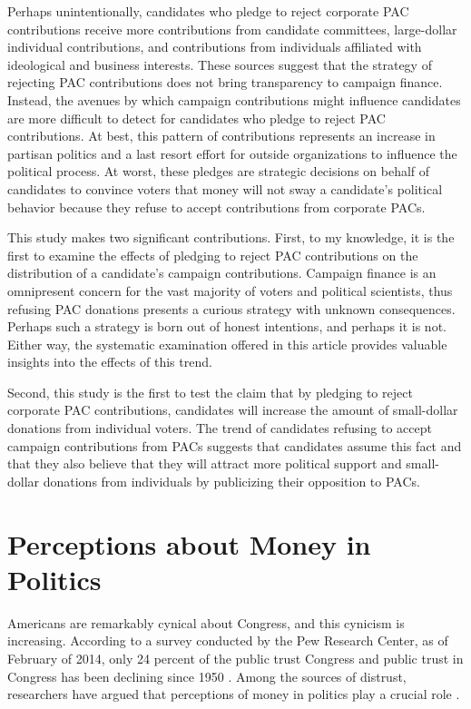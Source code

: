 \documentclass[12pt]{article}
\begin{document}
Perhaps unintentionally, candidates who pledge to reject corporate PAC contributions receive more contributions from candidate committees, large-dollar individual contributions, and contributions from individuals affiliated with ideological and business interests. These sources suggest that the strategy of rejecting PAC contributions does not bring transparency to campaign finance. Instead, the avenues by which campaign contributions might influence candidates are more difficult to detect for candidates who pledge to reject PAC contributions. At best, this pattern of contributions represents an increase in partisan politics and a last resort effort for outside organizations to influence the political process. At worst, these pledges are strategic decisions on behalf of candidates to convince voters that money will not sway a candidate's political behavior because they refuse to accept contributions from corporate PACs.     

This study makes two significant contributions. First, to my knowledge, it is the first to examine the effects of pledging to reject PAC contributions on the distribution of a candidate's campaign contributions. Campaign finance is an omnipresent concern for the vast majority of voters and political scientists, thus refusing PAC donations presents a curious strategy with unknown consequences. Perhaps such a strategy is born out of honest intentions, and perhaps it is not. Either way, the systematic examination offered in this article provides valuable insights into the effects of this trend. 

Second, this study is the first to test the claim that by pledging to reject corporate PAC contributions, candidates will increase the amount of small-dollar donations from individual voters. The trend of candidates refusing to accept campaign contributions from PACs suggests that candidates assume this fact and that they also believe that they will attract more political support and small-dollar donations from individuals by publicizing their opposition to PACs.  


\section{Perceptions about Money in Politics}

 Americans are remarkably cynical about Congress, and this cynicism is increasing. According to a survey conducted by the Pew Research Center, as of February of 2014, only 24 percent of the public trust Congress \citep{pewresearchcenter2014} and public trust in Congress has been declining since 1950 \citep{dalton2005}. Among the sources of distrust, researchers have argued that perceptions of money in politics play a crucial role \citep{lubenow2001}. 
 
\end{document}
